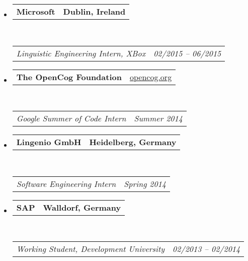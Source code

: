 \documentclass[10pt,letterpaper]{article}
\makeatletter
\newcommand{\headerrow}[2]
{\begin{tabular*}{\linewidth}{l@{\extracolsep{\fill}}r}
	#1 &
	#2 \\
\end{tabular*}}
\makeatother
\begin{document}
\begin{itemize}
	\item
	\headerrow
		{\textbf{Microsoft}}
		{\textbf{Dublin, Ireland}}
	\\
	\headerrow
		{\emph{Linguistic Engineering Intern, XBox}}
		{\emph{02/2015 -- 06/2015}}

	\item
	\headerrow
		{\textbf{The OpenCog Foundation}}
		{\url{opencog.org}}
	\\
	\headerrow
		{\emph{Google Summer of Code Intern}}
		{\emph{Summer 2014}}

	\item
	\headerrow
		{\textbf{Lingenio GmbH}}
		{\textbf{Heidelberg, Germany}}
	\\
	\headerrow
		{\emph{Software Engineering Intern}}
		{\emph{Spring 2014}}

	\item
	\headerrow
		{\textbf{SAP}}
		{\textbf{Walldorf, Germany}}
	\\
	\headerrow
		{\emph{Working Student, Development University}}
		{\emph{02/2013 -- 02/2014}}


\end{itemize}
\end{document}
